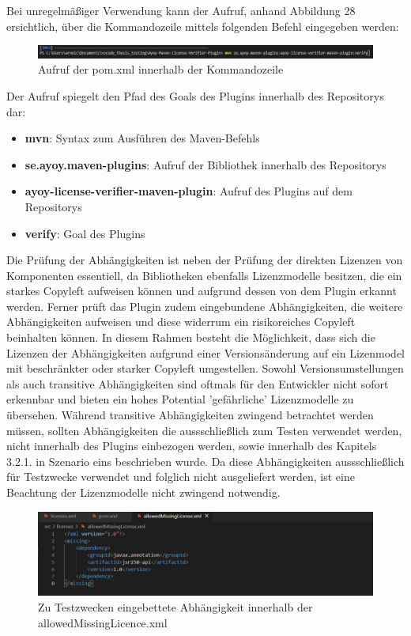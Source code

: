 Bei unregelmäßiger Verwendung kann der Aufruf, anhand Abbildung 28 ersichtlich, über die Kommandozeile mittels folgenden Befehl eingegeben werden:  

\begin{figure}[h]
    \centering
    \includegraphics[scale=0.5]{Bilder/mvn-Aufruf.png}
    \caption{Aufruf der pom.xml innerhalb der Kommandozeile}
\end{figure}

Der Aufruf spiegelt den Pfad des Goals des Plugins innerhalb des Repositorys dar: 

\begin{itemize}
    \item \textbf{mvn}: Syntax zum Ausführen des Maven-Befehls
    \item \textbf{se.ayoy.maven-plugins}: Aufruf der Bibliothek innerhalb des Repositorys
    \item \textbf{ayoy-license-verifier-maven-plugin}: Aufruf des Plugins auf dem Repositorys
    \item \textbf{verify}: Goal des Plugins
\end{itemize}

Die Prüfung der Abhängigkeiten ist neben der Prüfung der direkten Lizenzen von Komponenten essentiell, da Bibliotheken ebenfalls Lizenzmodelle besitzen, die ein starkes Copyleft aufweisen können und aufgrund dessen von dem Plugin erkannt werden. Ferner prüft das Plugin zudem eingebundene Abhängigkeiten, die weitere Abhängigkeiten aufweisen und diese widerrum ein risikoreiches Copyleft beinhalten können. In diesem Rahmen besteht die Möglichkeit, dass sich die Lizenzen der Abhängigkeiten aufgrund einer Versionsänderung auf ein Lizenmodel mit beschränkter oder starker Copyleft umgestellen. Sowohl Versionsumstellungen als auch transitive Abhängigkeiten sind oftmals für den Entwickler nicht sofort erkennbar und bieten ein hohes Potential 'gefährliche' Lizenzmodelle zu übersehen. Während transitive Abhängigkeiten zwingend betrachtet werden müssen, sollten Abhängigkeiten die aussschließlich zum Testen verwendet werden, nicht innerhalb des Plugins einbezogen werden, sowie innerhalb des Kapitels 3.2.1. in Szenario eins beschrieben wurde. Da diese Abhängigkeiten aussschließlich für Testzwecke verwendet und folglich nicht ausgeliefert werden, ist eine Beachtung der Lizenzmodelle nicht zwingend notwendig. 

\begin{figure}[h]
    \centering
    \includegraphics[scale=0.5]{Bilder/allowedmiisingLicence.png}
    \caption{Zu Testzwecken eingebettete Abhängigkeit innerhalb der allowedMissingLicence.xml}
\end{figure}

